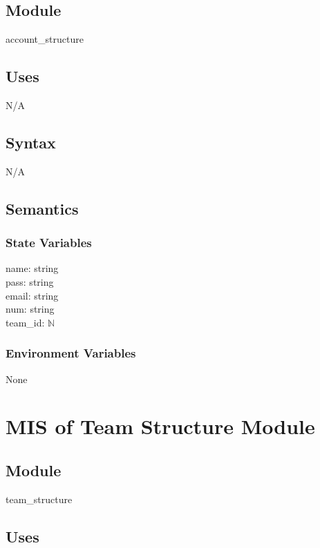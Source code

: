 \documentclass[12pt, titlepage]{article}
\begin{document}
\subsection{Module}

account\_structure

\subsection{Uses}

N/A

\subsection{Syntax}

N/A

\subsection{Semantics}

\subsubsection{State Variables}

name: string\\
pass: string\\
email: string\\
num: string\\
team\_id: $\mathbb{N}$

\subsubsection{Environment Variables}

None

\newpage

\section{MIS of Team Structure Module} \label{mTS}

\subsection{Module}

team\_structure

\subsection{Uses}
\end{document}
